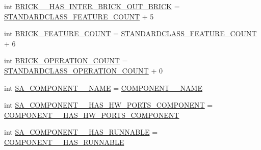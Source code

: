 \begin{DoxyCompactItemize}
\item 
int \hyperlink{interfaceshootingmachineemfmodel_1_1_shootingmachineemfmodel_package_ac16287b3242bdbff3dfb9c5c2793801c}{B\-R\-I\-C\-K\-\_\-\-\_\-\-H\-A\-S\-\_\-\-I\-N\-T\-E\-R\-\_\-\-B\-R\-I\-C\-K\-\_\-\-O\-U\-T\-\_\-\-B\-R\-I\-C\-K} = \hyperlink{interfaceshootingmachineemfmodel_1_1_shootingmachineemfmodel_package_a14037f66989b3107e402142df96ee9aa}{S\-T\-A\-N\-D\-A\-R\-D\-C\-L\-A\-S\-S\-\_\-\-F\-E\-A\-T\-U\-R\-E\-\_\-\-C\-O\-U\-N\-T} + 5
\item 
int \hyperlink{interfaceshootingmachineemfmodel_1_1_shootingmachineemfmodel_package_aa6135c0087ddefa4bda2cd529937b4bf}{B\-R\-I\-C\-K\-\_\-\-F\-E\-A\-T\-U\-R\-E\-\_\-\-C\-O\-U\-N\-T} = \hyperlink{interfaceshootingmachineemfmodel_1_1_shootingmachineemfmodel_package_a14037f66989b3107e402142df96ee9aa}{S\-T\-A\-N\-D\-A\-R\-D\-C\-L\-A\-S\-S\-\_\-\-F\-E\-A\-T\-U\-R\-E\-\_\-\-C\-O\-U\-N\-T} + 6
\item 
int \hyperlink{interfaceshootingmachineemfmodel_1_1_shootingmachineemfmodel_package_a1c0b9ea1c59e43a9df5e05458d39e1fa}{B\-R\-I\-C\-K\-\_\-\-O\-P\-E\-R\-A\-T\-I\-O\-N\-\_\-\-C\-O\-U\-N\-T} = \hyperlink{interfaceshootingmachineemfmodel_1_1_shootingmachineemfmodel_package_a2fe5d848cfe0a02fe5609e2c5ed7e7c7}{S\-T\-A\-N\-D\-A\-R\-D\-C\-L\-A\-S\-S\-\_\-\-O\-P\-E\-R\-A\-T\-I\-O\-N\-\_\-\-C\-O\-U\-N\-T} + 0
\item 
int \hyperlink{interfaceshootingmachineemfmodel_1_1_shootingmachineemfmodel_package_abd3d51d82b25096fb4284127f6bfb89b}{S\-A\-\_\-\-C\-O\-M\-P\-O\-N\-E\-N\-T\-\_\-\-\_\-\-N\-A\-M\-E} = \hyperlink{interfaceshootingmachineemfmodel_1_1_shootingmachineemfmodel_package_ae552299f65ef6bf3b518c7f1b7ddd0db}{C\-O\-M\-P\-O\-N\-E\-N\-T\-\_\-\-\_\-\-N\-A\-M\-E}
\item 
int \hyperlink{interfaceshootingmachineemfmodel_1_1_shootingmachineemfmodel_package_afa727a1f9f9db4ffc8ab990f94d695da}{S\-A\-\_\-\-C\-O\-M\-P\-O\-N\-E\-N\-T\-\_\-\-\_\-\-H\-A\-S\-\_\-\-H\-W\-\_\-\-P\-O\-R\-T\-S\-\_\-\-C\-O\-M\-P\-O\-N\-E\-N\-T} = \hyperlink{interfaceshootingmachineemfmodel_1_1_shootingmachineemfmodel_package_ac644767caab4c5f8046af2bdaaeedf09}{C\-O\-M\-P\-O\-N\-E\-N\-T\-\_\-\-\_\-\-H\-A\-S\-\_\-\-H\-W\-\_\-\-P\-O\-R\-T\-S\-\_\-\-C\-O\-M\-P\-O\-N\-E\-N\-T}
\item 
int \hyperlink{interfaceshootingmachineemfmodel_1_1_shootingmachineemfmodel_package_a769bd9f69a85284f85ec63fdee231651}{S\-A\-\_\-\-C\-O\-M\-P\-O\-N\-E\-N\-T\-\_\-\-\_\-\-H\-A\-S\-\_\-\-R\-U\-N\-N\-A\-B\-L\-E} = \hyperlink{interfaceshootingmachineemfmodel_1_1_shootingmachineemfmodel_package_a707b5f9c7dfe2171d33a511e14363de1}{C\-O\-M\-P\-O\-N\-E\-N\-T\-\_\-\-\_\-\-H\-A\-S\-\_\-\-R\-U\-N\-N\-A\-B\-L\-E}

\end{DoxyCompactItemize}
